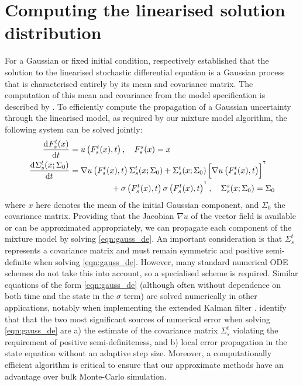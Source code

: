 \section{Computing the linearised solution distribution}\label{sec:mazzoni}
For a Gaussian or fixed initial condition,  respectively established that the solution to the linearised stochastic differential equation is a Gaussian process that is characterised entirely by its mean and covariance matrix.
The computation of this mean and covariance from the model specification is described by .
To efficiently compute the propagation of a Gaussian uncertainty through the linearised model, as required by our mixture model algorithm, the following system can be solved jointly:
\begin{subequations}\label{eqn:gauss_de}
	\begin{align}
		\dod{F_s^t(x)}{t}                & = u\left(F_s^t(x), t\right), \quad F_s^s(x) = x \label{eqn:gauss_mean_de}                                                              \\
		\dod{\Sigma_s^t(x; \Sigma_0)}{t} & = \begin{multlined}[t]
			                                     \nabla u\left(F_s^t(x), t\right) \Sigma_s^t(x; \Sigma_0) + \Sigma_s^t(x; \Sigma_0)\left[\nabla u\left(F_s^t(x), t\right)\right]^{\T} \\
			                                     + \sigma\left(F_s^t(x), t \right)\sigma\left(F_s^t(x), t\right)^{\T}, \quad \Sigma_s^s\!\left(x; \Sigma_0\right) = \Sigma_0
		                                     \end{multlined} \label{eqn:gauss_cov_de}
	\end{align}
\end{subequations}
where \(x\) here denotes the mean of the initial Gaussian component, and \(\Sigma_0\) the covariance matrix.
Providing that the Jacobian \(\nabla u\) of the vector field is available or can be approximated appropriately, we can propagate each component of the mixture model by solving \eqref{eqn:gauss_de}.
An important consideration is that \(\Sigma_s^t\) represents a covariance matrix and must remain symmetric and positive semi-definite when solving \eqref{eqn:gauss_de}.
However, many standard numerical ODE schemes do not take this into account, so a specialised scheme is required.
Similar equations of the form \eqref{eqn:gauss_de} (although often without dependence on both time and the state in the \(\sigma\) term) are solved numerically in other applications, notably when implementing the extended Kalman filter \citep{Jazwinski_2014_StochasticProcessesFiltering, KulikovaKulikov_2014_AdaptiveODESolvers}.
\citet{KulikovaKulikov_2014_AdaptiveODESolvers} identify that that the two most significant sources of numerical error when solving \eqref{eqn:gauss_de} are a) the estimate of the covariance matrix \(\Sigma_s^t\) violating the requirement of positive semi-definiteness, and b) local error propagation in the state equation without an adaptive step size.
Moreover, a computationally efficient algorithm is critical to ensure that our approximate methods have an advantage over bulk Monte-Carlo simulation.

